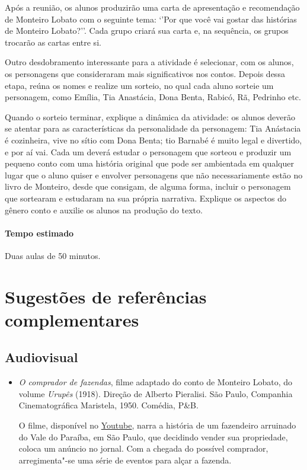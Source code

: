 \documentclass[11pt]{extarticle}
\begin{document}
Após a reunião, os alunos produzirão uma carta de apresentação e recomendação de Monteiro Lobato com o seguinte tema: ‘’Por que você vai gostar das histórias de Monteiro Lobato?’’. Cada grupo criará sua carta e, na sequência, os grupos trocarão as cartas entre si.

Outro desdobramento interessante para a atividade é selecionar, com os alunos, os personagens que consideraram mais significativos nos contos. 
Depois dessa etapa, reúna os nomes e realize um sorteio, no qual cada aluno sorteie um personagem, como Emília, Tia Anastácia, Dona Benta, Rabicó, Rã, Pedrinho etc.

Quando o sorteio terminar, explique a dinâmica da atividade: os alunos deverão se atentar para as características da personalidade da personagem: Tia Anástacia é cozinheira, vive no sítio com Dona Benta; tio Barnabé é muito legal e divertido, e por aí vai. 
Cada um deverá estudar o personagem que sorteou e produzir um pequeno conto com uma história original que pode ser ambientada em qualquer lugar que o aluno quiser e envolver personagens que não necessariamente estão no livro de Monteiro, desde que consigam, de alguma forma, incluir o personagem que sortearam e estudaram na sua própria narrativa. Explique os aspectos do gênero conto e auxilie os alunos na produção do texto.


\paragraph{Tempo estimado} Duas aulas de 50 minutos.

\section{Sugestões de referências complementares}

\subsection{Audiovisual}

\begin{itemize}

\item \textit{O comprador de fazendas}, filme adaptado do conto de Monteiro
Lobato, do volume \emph{Urupês} (1918). Direção de Alberto Pieralisi.
São Paulo, Companhia Cinematográfica Maristela, 1950. Comédia, P\&B.

O filme, disponível no \href{https://www.youtube.com/watch?v=LcdfdfD9_Bs}{Youtube}, 
narra a história de um fazendeiro arruinado do Vale do Paraíba, em
São Paulo, que decidindo vender sua propriedade, coloca um anúncio no jornal.
Com a chegada do possível comprador, arregimenta"-se uma série de eventos para 
alçar a fazenda. 
\end{itemize}
\end{document}
